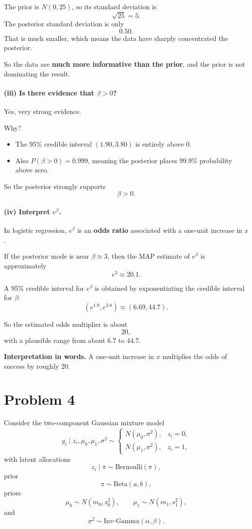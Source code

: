 \documentclass[11pt]{article}
\begin{document}
The prior is $N(0,25)$, so its standard deviation is
\[
\sqrt{25}=5.
\]
The posterior standard deviation is only
\[
0.50.
\]
That is much smaller, which means the data have sharply concentrated the posterior.

So the data are \textbf{much more informative than the prior}, and the prior is not dominating the result.

\paragraph{(iii) Is there evidence that $\beta>0$?}

Yes, very strong evidence.

Why?
\begin{itemize}[leftmargin=1.5em]
    \item The 95\% credible interval $(1.90,3.80)$ is entirely above $0$.
    \item Also $P(\beta>0)=0.999$, meaning the posterior places 99.9\% probability above zero.
\end{itemize}

So the posterior strongly supports
\[
\beta>0.
\]

\paragraph{(iv) Interpret $e^\beta$.}

In logistic regression, $e^\beta$ is an \textbf{odds ratio} associated with a one-unit increase in $x$.

If the posterior mode is near $\beta\approx 3$, then the MAP estimate of $e^\beta$ is approximately
\[
e^3\approx 20.1.
\]

A 95\% credible interval for $e^\beta$ is obtained by exponentiating the credible interval for $\beta$:
\[
\left(e^{1.9},e^{3.8}\right)\approx (6.69,44.7).
\]

So the estimated odds multiplier is about
\[
20,
\]
with a plausible range from about $6.7$ to $44.7$.

\bigskip
\noindent
\textbf{Interpretation in words.}  
A one-unit increase in $x$ multiplies the odds of success by roughly $20$.

\newpage

\section*{Problem 4}

Consider the two-component Gaussian mixture model
\[
y_i \mid z_i,\mu_0,\mu_1,\sigma^2
\sim
\begin{cases}
N(\mu_0,\sigma^2), & z_i=0,\\[0.3em]
N(\mu_1,\sigma^2), & z_i=1,
\end{cases}
\]
with latent allocations
\[
z_i\mid \pi \sim \text{Bernoulli}(\pi),
\]
prior
\[
\pi\sim \text{Beta}(a,b),
\]
priors
\[
\mu_0\sim N(m_0,s_0^2),
\qquad
\mu_1\sim N(m_1,s_1^2),
\]
and
\[
\sigma^2\sim \text{Inv-Gamma}(\alpha,\beta).
\]
\end{document}
